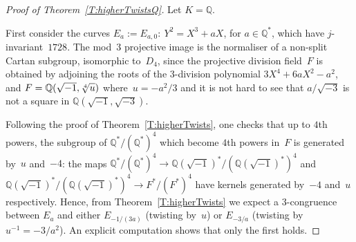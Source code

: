\documentclass[12pt, reqno]{amsart}
\newcommand{\F}{\mathbb{F}}
\newcommand{\Q}{\mathbb{Q}}
\newcommand{\Z}{\mathbb{Z}}
\newcommand{\calO}{\mathcal{O}}
\newcommand{\diag}{{\operatorname{diag}}}
\numberwithin{equation}{section}
\theoremstyle{definition}
\theoremstyle{remark}
\newcommand{\jc}[1]{{\color{darkgreen} \textsf{[JC: #1]}}}
\begin{document}
\begin{proof}[Proof of Theorem~\ref{T:higherTwistsQ}] Let $K=\Q$.

First consider the curves $E_a := E_{a,0}:\ Y^2=X^3+aX$, for $a \in
\Q^*$, which have $j$-invariant~$1728$.  The mod~$3$ projective image
is the normaliser of a non-split Cartan subgroup, isomorphic to~$D_4$, since
the projective division field~$F$ is obtained by adjoining the roots
of the $3$-division polynomial $3X^4+6aX^2-a^2$, and
$F=\Q(\sqrt{-1},\root4\of u)$ where~$u=-a^2/3$ and it is not hard to
see that $a/\sqrt{-3}$ is not a square in $\Q(\sqrt{-1},\sqrt{-3})$.

Following the proof of Theorem~\ref{T:higherTwists}, one checks
that up to $4$th powers, the subgroup of $\Q^*/(\Q^*)^4$ which become
$4$th powers in~$F$ is generated by~$u$ and~$-4$: the maps
$\Q^*/(\Q^*)^4 \to \Q(\sqrt{-1})^*/(\Q(\sqrt{-1})^*)^4$ and
$\Q(\sqrt{-1})^*/(\Q(\sqrt{-1})^*)^4 \to F^*/(F^*)^4$ have kernels
generated by~$-4$ and~$u$ respectively.  Hence, from
Theorem~\ref{T:higherTwists} we expect a $3$-congruence between
$E_a$ and either $E_{-1/(3a)}$ (twisting by~$u$) or $E_{-3/a}$
(twisting by~$u^{-1}=-3/a^2$).  An explicit computation shows that
only the first holds.

\begin{comment}
\jc{Details:}

The roots of the division polynomial are $\{\pm x_1, \pm x_2\}$ where
$x_1=\frac{1+\sqrt{3}}{1-i}\root4\of{u}$ and
$x_2=\frac{1-\sqrt{3}}{1+i}\root4\of{u}$.

Let $P_1=(x_1,y_1)\in E_1[3]$, where $y_1$ is either square root of
$y_1^2=x_1(x_1^2+a)$ (in fact, $y_1=(1-i)x_1\sqrt{x_2}$).  We compute
the action of $\calO$ on~$E_a[3]$, after fixing an embedding
$\calO=\Z[i]\hookrightarrow \Q(i)=K'$, by setting
$[i](x,y)=(i^2x,i^3y)=(-x,-iy)$.  The map $\calO\to E_a[3]$ sending
$\alpha\mapsto P_{\alpha}:=[\alpha]P_1$ induces an isomorphism
$\calO/3\calO\cong E_a[3]$, the latter being a rank~$1$ module over
$\calO/3\calO\cong\F_9$.  In particular, an $\F_3$-basis of $E_a[3]$
is $(P_1,P_i)$.

We have $P_i=[i]P_1=(-x_1,-iy_1)$, $P_{-1}=-P_1=(x_1,-y_1)$ and
$P_{-i}=-P_i=(-x_1,iy_1)$.

Next we diagonalise this action after tensoring with~$\F_9$, noting
that $E_a[3]\otimes_{\F_3}\F_9\cong\F_9\oplus\F_9$.  To avoid
confusing $i=\sqrt{-1}\in\calO$ with $\sqrt{-1}\in\F_9$, we write
$\F_9=\F_3(j)$ where $j^2=-1$.  Define $Q_1=P_1-jP_i=[1-ji]P_1$ and
$Q_2=P_1+jP_i=[1+ji]P_1$.  Then
\[
[i]Q_1 = [i(1-ji)]P_1 = [i+j]P_1 = [j(1-ji)]P_1 = jQ_1,
\]
and similarly $[i]Q_2=-jQ_2$.  Then $(Q_1,Q_2)$ is the desired basis,
with respect to which $c+di\in\calO$ acts with
matrix~$\diag(c+dj,c-dj)$.


\end{comment}
\end{proof}
\end{document}
